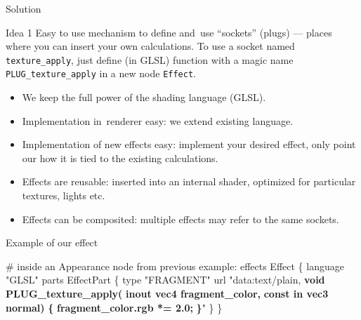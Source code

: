 \documentclass{beamer}
\begin{document}
\begin{frame}{Solution}

\begin{block}{Idea 1}
Easy to use mechanism to define and~use
``sockets'' (plugs) --- places where you can insert your own calculations.
To use a socket named \texttt{texture\_apply},
just define (in GLSL) function with a magic name \texttt{PLUG\_texture\_apply}
in a new node \texttt{Effect}.
\end{block}

\begin{itemize}
  \item We keep the full power of the shading language (GLSL).
  \item Implementation in~renderer easy: we extend existing language.
  \item Implementation of new effects easy: implement
    your desired effect, only point our how it is tied to the existing
    calculations.
  \item Effects are reusable: inserted into an internal shader,
    optimized for particular textures, lights etc.
  \item Effects can be composited: multiple effects may refer to the same sockets.
\end{itemize}
\end{frame}

\begin{frame}[fragile]
\begin{exampleblock}{Example of our effect}
\begin{semiverbatim}
# inside an Appearance node from previous example:
effects Effect \{
  language "GLSL"
  parts EffectPart \{
    type "FRAGMENT"
    url "data:text/plain,
\textbf{    void PLUG\_texture\_apply(}
\textbf{      inout vec4 fragment\_color,}
\textbf{      const in vec3 normal)}
\textbf{    \{}
\textbf{      fragment\_color.rgb *= 2.0;}
\textbf{    \}}"
  \}
\}
\end{semiverbatim}
\end{exampleblock}
\end{frame}

\end{document}
